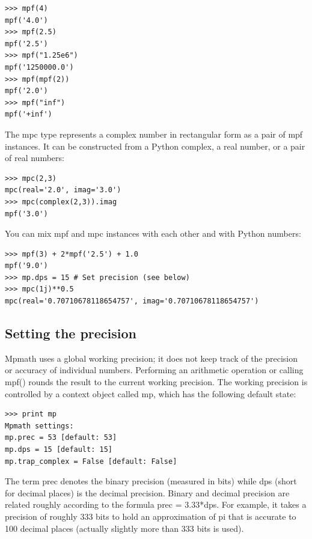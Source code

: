 \begin{lstlisting}
>>> mpf(4)
mpf('4.0')
>>> mpf(2.5)
mpf('2.5')
>>> mpf("1.25e6")
mpf('1250000.0')
>>> mpf(mpf(2))
mpf('2.0')
>>> mpf("inf")
mpf('+inf')
\end{lstlisting}


The mpc type represents a complex number in rectangular form as a pair of mpf instances. It can be constructed from a Python complex, a real number, or a pair of real numbers:

\begin{lstlisting}
>>> mpc(2,3)
mpc(real='2.0', imag='3.0')
>>> mpc(complex(2,3)).imag
mpf('3.0')
\end{lstlisting}


You can mix mpf and mpc instances with each other and with Python numbers:

\begin{lstlisting}
>>> mpf(3) + 2*mpf('2.5') + 1.0
mpf('9.0')
>>> mp.dps = 15 # Set precision (see below)
>>> mpc(1j)**0.5
mpc(real='0.70710678118654757', imag='0.70710678118654757')
\end{lstlisting}


\subsection{Setting the precision} 

Mpmath uses a global working precision; it does not keep track of the precision or accuracy of individual numbers. Performing an arithmetic operation or calling mpf() rounds the result to the current working precision. The working precision is controlled by a context object
called mp, which has the following default state:

\begin{lstlisting}
>>> print mp
Mpmath settings:
mp.prec = 53 [default: 53]
mp.dps = 15 [default: 15]
mp.trap_complex = False [default: False]
\end{lstlisting}


The term prec denotes the binary precision (measured in bits) while dps (short for decimal places) is the decimal precision. Binary and decimal precision are related roughly according to the formula prec = 3.33*dps. For example, it takes a precision of roughly 333 bits to hold an approximation of pi that is accurate to 100 decimal places (actually slightly more than 333 bits is used).

